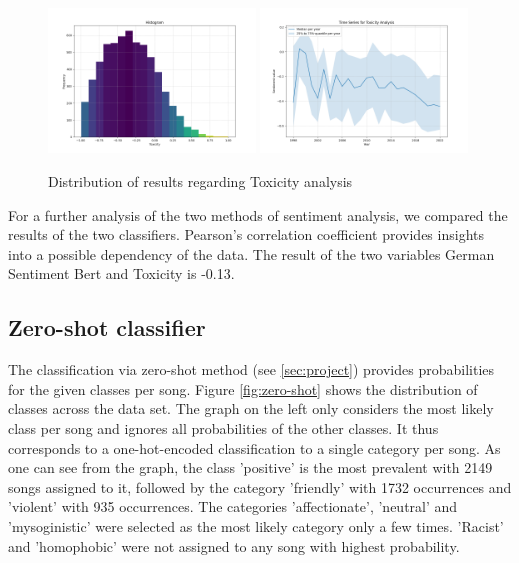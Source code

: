 \begin{figure}[!htb]
    \centering
    \includegraphics[width=0.49\textwidth]{figures/toxicity_histogram.png}
    \includegraphics[width=0.49\textwidth]{figures/time_series_toxicity.png}
    \caption{Distribution of results regarding Toxicity analysis}
    \label{fig:toxicity}
\end{figure}

For a further analysis of the two methods of sentiment analysis, we compared the results of the two classifiers. Pearson's correlation coefficient provides insights into a possible dependency of the data. The result of the two variables German Sentiment Bert and Toxicity is -0.13.



\subsection*{Zero-shot classifier}

The classification via zero-shot method (see \autoref{sec:project}) provides probabilities for the given classes per song. Figure \autoref{fig:zero-shot} shows the distribution of classes across the data set. The graph on the left only considers the most likely class per song and ignores all probabilities of the other classes. It thus corresponds to a one-hot-encoded classification to a single category per song. As one can see from the graph, the class 'positive' is the most prevalent with 2149 songs assigned to it, followed by the category 'friendly' with 1732 occurrences and 'violent' with 935 occurrences. The categories 'affectionate', 'neutral' and 'mysoginistic' were selected as the most likely category only a few times. 'Racist' and 'homophobic' were not assigned to any song with highest probability.

